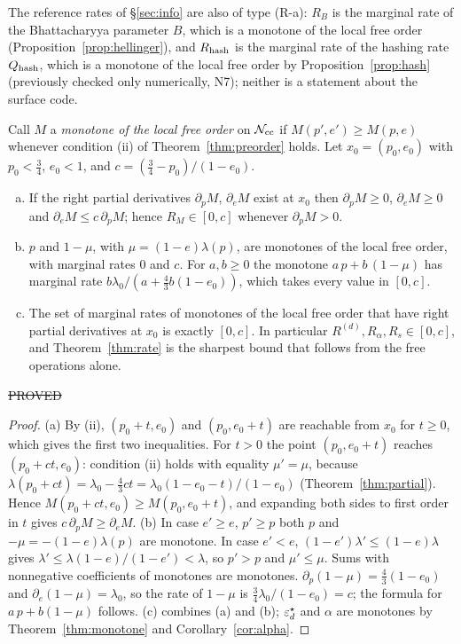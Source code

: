 The reference rates of \S\ref{sec:info} are also of type (R-a): $R_B$ is the marginal rate of the Bhattacharyya parameter $B$, which is a monotone of the local free order (Proposition~\ref{prop:hellinger}), and $R_{\rm hash}$ is the marginal rate of the hashing rate $Q_{\rm hash}$, which is a monotone of the local free order by Proposition~\ref{prop:hash} (previously checked only numerically, N7); neither is a statement about the surface code.

\begin{proposition}\label{prop:marginal}
Call $M$ a \emph{monotone of the local free order} on $\mathcal{N}_{\rm cc}$ if $M(p',e')\ge M(p,e)$ whenever condition (ii) of Theorem~\ref{thm:preorder} holds. Let $x_0=(p_0,e_0)$ with $p_0<\tfrac34$, $e_0<1$, and $c=(\tfrac34-p_0)/(1-e_0)$.
\begin{enumerate}[(a)]
\item If the right partial derivatives $\partial_pM$, $\partial_eM$ exist at $x_0$ then $\partial_pM\ge0$, $\partial_eM\ge0$ and $\partial_eM\le c\,\partial_pM$; hence $R_M\in[0,c]$ whenever $\partial_pM>0$.
\item $p$ and $1-\mu$, with $\mu=(1-e)\lambda(p)$, are monotones of the local free order, with marginal rates $0$ and $c$. For $a,b\ge0$ the monotone $a\,p+b\,(1-\mu)$ has marginal rate $b\lambda_0/(a+\tfrac43b(1-e_0))$, which takes every value in $[0,c]$.
\item The set of marginal rates of monotones of the local free order that have right partial derivatives at $x_0$ is exactly $[0,c]$. In particular $R^{(d)},R_\alpha,R_s\in[0,c]$, and Theorem~\ref{thm:rate} is the sharpest bound that follows from the free operations alone.
\end{enumerate}
\hfill\st{PROVED}
\end{proposition}
\begin{proof}
(a) By (ii), $(p_0+t,e_0)$ and $(p_0,e_0+t)$ are reachable from $x_0$ for $t\ge0$, which gives the first two inequalities. For $t>0$ the point $(p_0,e_0+t)$ reaches $(p_0+ct,e_0)$: condition (ii) holds with equality $\mu'=\mu$, because $\lambda(p_0+ct)=\lambda_0-\tfrac43ct=\lambda_0(1-e_0-t)/(1-e_0)$ (Theorem~\ref{thm:partial}). Hence $M(p_0+ct,e_0)\ge M(p_0,e_0+t)$, and expanding both sides to first order in $t$ gives $c\,\partial_pM\ge\partial_eM$.
(b) In case $e'\ge e$, $p'\ge p$ both $p$ and $-\mu=-(1-e)\lambda(p)$ are monotone. In case $e'<e$, $(1-e')\lambda'\le(1-e)\lambda$ gives $\lambda'\le\lambda(1-e)/(1-e')<\lambda$, so $p'>p$ and $\mu'\le\mu$. Sums with nonnegative coefficients of monotones are monotones.
$\partial_p(1-\mu)=\tfrac43(1-e_0)$ and $\partial_e(1-\mu)=\lambda_0$, so the rate of $1-\mu$ is $\tfrac34\lambda_0/(1-e_0)=c$; the formula for $a\,p+b(1-\mu)$ follows. (c) combines (a) and (b); $\varepsilon^{\star}_d$ and $\alpha$ are monotones by Theorem~\ref{thm:monotone} and Corollary~\ref{cor:alpha}.
\end{proof}


